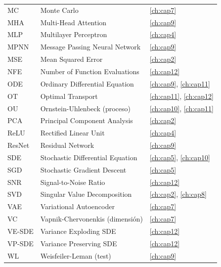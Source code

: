 \begin{center}
\begin{tabular}{ll p{8cm}}
MC     & Monte Carlo                         & \ref{ch:cap7} \\
MHA    & Multi-Head Attention                & \ref{ch:cap9} \\
MLP    & Multilayer Perceptron               & \ref{ch:cap4} \\
MPNN   & Message Passing Neural Network      & \ref{ch:cap9} \\
MSE    & Mean Squared Error                  & \ref{ch:cap2} \\
NFE    & Number of Function Evaluations      & \ref{ch:cap12} \\
ODE    & Ordinary Differential Equation      & \ref{ch:cap9}, \ref{ch:cap11} \\
OT     & Optimal Transport                   & \ref{ch:cap11}, \ref{ch:cap12} \\
OU     & Ornstein-Uhlenbeck (proceso)        & \ref{ch:cap10}, \ref{ch:cap11} \\
PCA    & Principal Component Analysis        & \ref{ch:cap2} \\
ReLU   & Rectified Linear Unit               & \ref{ch:cap4} \\
ResNet & Residual Network                    & \ref{ch:cap9} \\
SDE    & Stochastic Differential Equation    & \ref{ch:cap5}, \ref{ch:cap10} \\
SGD    & Stochastic Gradient Descent         & \ref{ch:cap5} \\
SNR    & Signal-to-Noise Ratio               & \ref{ch:cap12} \\
SVD    & Singular Value Decomposition        & \ref{ch:cap2}, \ref{ch:cap8} \\
VAE    & Variational Autoencoder             & \ref{ch:cap7} \\
VC     & Vapnik-Chervonenkis (dimensión)     & \ref{ch:cap7} \\
VE-SDE & Variance Exploding SDE              & \ref{ch:cap12} \\
VP-SDE & Variance Preserving SDE             & \ref{ch:cap12} \\
WL     & Weisfeiler-Leman (test)             & \ref{ch:cap9} \\
\bottomrule
\end{tabular}
\end{center}

\printbibliography[heading=subbibliography]